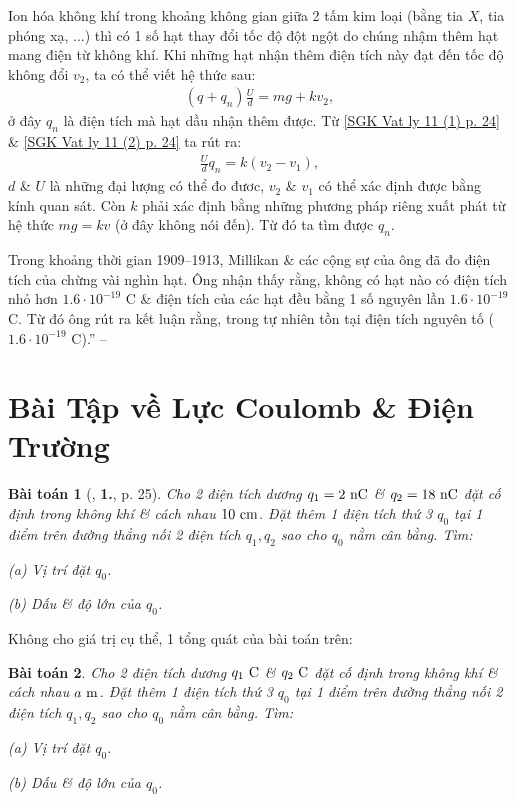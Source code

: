 \documentclass[oneside]{book}
\numberwithin{equation}{section}
\newtheorem{baitoan}{Bài toán}[section]
\begin{document}
Ion hóa không khí trong khoảng không gian giữa 2 tấm kim loại (bằng tia $X$, tia phóng xạ, $\ldots$) thì có 1 số hạt thay đổi tốc độ đột ngột do chúng nhậm thêm hạt mang điện từ không khí. Khi những hạt nhận thêm điện tích này đạt đến tốc độ không đổi $v_2$, ta có thể viết hệ thức sau:
\begin{align}
	\label{SGK Vat ly 11 (2) p. 24}
	(q + q_n)\frac{U}{d} = mg + kv_2,
\end{align}
ở đây $q_n$ là điện tích mà hạt dầu nhận thêm được. Từ \eqref{SGK Vat ly 11 (1) p. 24} \& \eqref{SGK Vat ly 11 (2) p. 24} ta rút ra:
\begin{align*}
	\frac{U}{d}q_n = k(v_2 - v_1),
\end{align*}
$d$ \& $U$ là những đại lượng có thể đo đươc, $v_2$ \& $v_1$ có thể xác định được bằng kính quan sát. Còn $k$ phải xác định bằng những phương pháp riêng xuất phát từ hệ thức $mg = kv$ (ở đây không nói đến). Từ đó ta tìm được $q_n$.

Trong khoảng thời gian 1909--1913, Millikan \& các cộng sự của ông đã đo điện tích của chừng vài nghìn hạt. Ông nhận thấy rằng, không có hạt nào có điện tích nhỏ hơn $1.6\cdot 10^{-19}$ C \& điện tích của các hạt đều bằng 1 số nguyên lần $1.6\cdot 10^{-19}$ C. Từ đó ông rút ra kết luận rằng, trong tự nhiên tồn tại điện tích nguyên tố ($1.6\cdot 10^{-19}$ C).'' -- \cite[pp. 23--24]{SGK_Vat_Ly_11_nang_cao}


\section{Bài Tập về Lực Coulomb \& Điện Trường}

\begin{baitoan}[\cite{SGK_Vat_Ly_11_nang_cao}, \textbf{1.}, p. 25]
	Cho 2 điện tích dương $q_1 = 2\ {\rm nC}$ \& $q_2 = 18\ {\rm nC}$ đặt cố định trong không khí \& cách nhau $10\ {\rm cm}$. Đặt thêm 1 điện tích thứ 3 $q_0$ tại 1 điểm trên đường thẳng nối 2 điện tích $q_1,q_2$ sao cho $q_0$ nằm cân bằng. Tìm:
	\begin{enumerate*}
		\item[(a)] Vị trí đặt $q_0$.
		\item[(b)] Dấu \& độ lớn của $q_0$.
	\end{enumerate*}
\end{baitoan}
Không cho giá trị cụ thể, 1 tổng quát của bài toán trên:
\begin{baitoan}
	Cho 2 điện tích dương $q_1\ {\rm C}$ \& $q_2\ {\rm C}$ đặt cố định trong không khí \& cách nhau $a\ {\rm m}$. Đặt thêm 1 điện tích thứ 3 $q_0$ tại 1 điểm trên đường thẳng nối 2 điện tích $q_1,q_2$ sao cho $q_0$ nằm cân bằng. Tìm:
	\begin{enumerate*}
		\item[(a)] Vị trí đặt $q_0$.
		\item[(b)] Dấu \& độ lớn của $q_0$.
	\end{enumerate*}
\end{baitoan}
\end{document}
